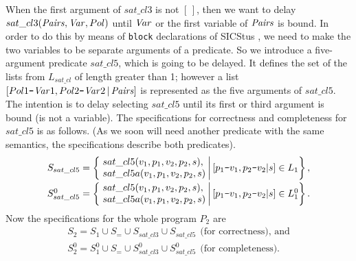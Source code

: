\documentclass{tlp}
\newcommand*{\mydash}{{\mbox{\tt-}}}
\begin{document}
When the first argument of $sat\_cl3$ is not $[\,]$, then we want
to delay $sat\_cl3({\it Pairs}, {\it Var}, Pol)$ until ${\it Var}$ or the first
variable of ${\it Pairs}$ is bound.
In order to do this by means of {\tt block} declarations of SICStus
\cite{sicstus.Carlsson.tplp12},
we need to make the two variables to be separate arguments of a
predicate.  So we introduce a five-argument predicate $sat\_cl5$,
which is going to be delayed.
It defines the set of the lists from $L_{sat\_cl}$ of length greater than 1;
however a list $[Pol1\mydash {\it Var}1, Pol2\mydash {\it Var}2\, |\, {\it Pairs}]$ is
represented as the five arguments
of  $sat\_cl5$.
The intention is to delay selecting $sat\_cl5$ until its first or third
argument is bound (is not a variable).
The specifications for correctness and completeness for $sat\_cl5$ is as
follows.  (As we soon will need another predicate with the same semantics,
the specifications describe both predicates).
{\sloppy
    \[
    \begin{array}{l}
    S_{sat\_cl5}  = \left\{\, \left.
          \begin{array}[c]{@{}l@{\:}}
           sat\_cl5(v_1,p_1,v_2,p_2,s), \\
           sat\_cl5a(v_1,p_1,v_2,p_2,s)
          \end{array}
          \right|
          [p_1\mydash v_1,p_2\mydash v_2|s]\in L_1
    \right\},
    \\[2ex]  S_{sat\_cl5}^0  = \left\{\, \left.
          \begin{array}[c]{@{}l@{\:}}
           sat\_cl5(v_1,p_1,v_2,p_2,s), \\
           sat\_cl5a(v_1,p_1,v_2,p_2,s)
          \end{array}
          \right|
          [p_1\mydash v_1,p_2\mydash v_2|s]\in L_1^0
    \right\}.
    \end{array}
    \]
}Now the specifications for the whole program $P_2$ are
\[
\begin{array}{l}
  S_2 = S_1\cup S_=\cup S_{sat\_cl3}\cup S_{sat\_cl5}\ \
      \mbox{(for correctness), and} \\
  S_2^0 = S_1^0\cup S_=\cup S_{sat\_cl3}^0\cup S_{sat\_cl5}^0\ \
      \mbox{(for completeness).}
\end{array}
\]
\end{document}
